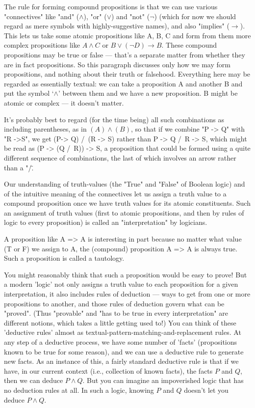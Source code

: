 The rule for forming compound propositions is that we can use various "connectives" like "and" ($\wedge$), "or" ($\vee$) and "not" ($\neg$) (which for now we should regard as mere symbols with highly-suggestive names), and also "implies" ($\to$). This lets us take some atomic propositions like A, B, C and form from them more complex propositions like $A \wedge C$ or $B\vee (\neg D) \to B$. These compound propositions may be true or false --- that's a separate matter from whether they are in fact propositions. So this paragraph discusses only how we may form propositions, and nothing about their truth or falsehood. Everything here may be regarded as essentially textual: we can take a proposition A and another B and put the symbol `$\wedge$' between them and we have a new proposition. B might be atomic or complex --- it doesn't matter. 

It's probably best to regard (for the time being) all such combinations as including parentheses, as in $(A) \wedge (B)$, so that if we combine "P -> Q" with "R ->S", we get (P-> Q) /\ (R -> S) rather than P -> Q /\ R -> S, which might be read as (P -> (Q /\ R)) -> S, a proposition that could be formed using a quite different sequence of combinations, the last of which involves an arrow rather than a "/\".  

Our understanding of truth-values (the "True" and "False" of Boolean logic) and of the intuitive meaning of the connectives let us assign a truth value to a compound proposition once we have truth values for its atomic constituents. Such an assignment of truth values (first to atomic propositions, and then by rules of logic to every proposition) is called an "interpretation" by logicians. 

A proposition like A => A is interesting in part because no matter what value (T or F) we assign to A, the (compound) proposition A => A is always true. Such a proposition is called a tautology.

You might reasonably think that such a proposition would be easy to prove! But a modern 'logic' not only assigns a truth value to each proposition for a given interpretation, it also includes rules of deduction --- ways to get from one or more propositions to another, and those rules of deduction govern what can be "proved". 
(Thus "provable" and "has to be true in every interpretation" are different notions, which takes a little getting used to!)  You can think of these 'deductive rules' almost as textual-pattern-matching-and-replacement rules. At any step of a deductive process, we have some number of 'facts' (propositions known to be true for some reason), and we can use a deductive rule to generate new facts. 
As an instance of this, a fairly standard deductive rule is that if we have, in our current context (i.e., collection of known facts), the facts $P$ and $Q$, then we can deduce $P\wedge Q$. But you can imagine an impoverished logic that has no deduction rules at all. In such a logic, knowing $P$ and $Q$ doesn't let you deduce $P \wedge Q$. 

